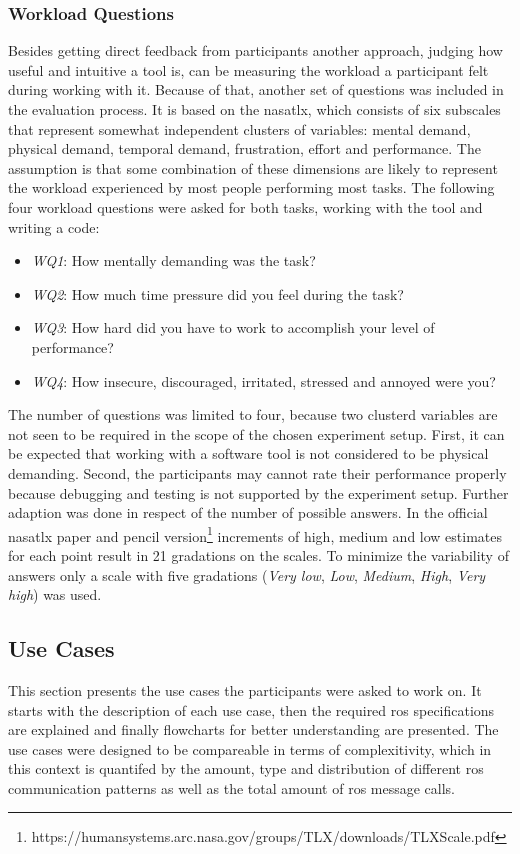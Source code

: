 \subsubsection*{Workload Questions}
Besides getting direct feedback from participants another approach, judging how useful and intuitive a tool is, can be measuring the workload a participant felt during working with it. Because of that, another set of questions was included in the evaluation process. It is based on the \gls{nasatlx}\cite{HART1988139}, which consists of six subscales that represent somewhat independent clusters of variables: mental demand, physical demand, temporal demand, frustration, effort and performance. The assumption is that some combination of these dimensions are likely to represent the workload experienced by most people performing most tasks. The following four workload questions were asked for both tasks, working with the tool and writing a code:
\begin{itemize}
    \item \textit{WQ1}: How mentally demanding was the task?
    \item \textit{WQ2}: How much time pressure did you feel during the task?
    \item \textit{WQ3}: How hard did you have to work to accomplish your level of performance?
    \item \textit{WQ4}: How insecure, discouraged, irritated, stressed and annoyed were you?
\end{itemize}
The number of questions was limited to four, because two clusterd variables are not seen to be required in the scope of the chosen experiment setup. First, it can be expected that working with a software tool is not considered to be physical demanding. Second, the participants may cannot rate their performance properly because debugging and testing is not supported by the experiment setup. Further adaption was done in respect of the number of possible answers. In the official \gls{nasatlx} paper and pencil version\footnote{https://humansystems.arc.nasa.gov/groups/TLX/downloads/TLXScale.pdf} increments of high, medium and low estimates for each point result in 21 gradations on the scales. To minimize the variability of answers only a scale with five gradations (\textit{Very low}, \textit{Low}, \textit{Medium}, \textit{High}, \textit{Very high}) was used.

\subsection{Use Cases} \label{sub:UseCases}
This section presents the use cases the participants were asked to work on. It starts with the description of each use case, then the required \gls{ros} specifications are explained and finally flowcharts for better understanding are presented. The use cases were designed to be compareable in terms of complexitivity, which in this context is quantifed by the amount, type and distribution of different \gls{ros} communication patterns as well as the total amount of \gls{ros} message calls.

